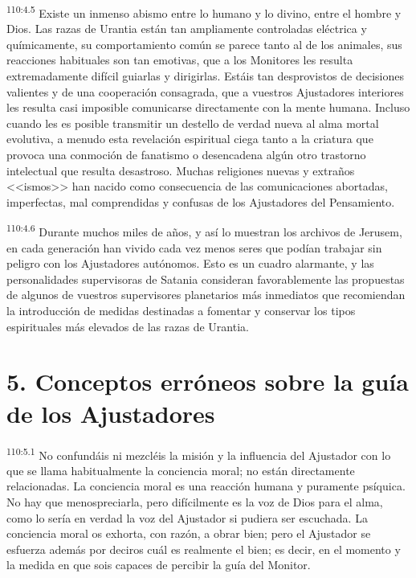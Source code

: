 \documentclass[twoside, 11pt]{book}
\begin{document}
\par
\textsuperscript{110:4.5} Existe un inmenso abismo entre lo humano y lo divino, entre el hombre y Dios. Las razas de Urantia están tan ampliamente controladas eléctrica y químicamente, su comportamiento común se parece tanto al de los animales, sus reacciones habituales son tan emotivas, que a los Monitores les resulta extremadamente difícil guiarlas y dirigirlas. Estáis tan desprovistos de decisiones valientes y de una cooperación consagrada, que a vuestros Ajustadores interiores les resulta casi imposible comunicarse directamente con la mente humana. Incluso cuando les es posible transmitir un destello de verdad nueva al alma mortal evolutiva, a menudo esta revelación espiritual ciega tanto a la criatura que provoca una conmoción de fanatismo o desencadena algún otro trastorno intelectual que resulta desastroso. Muchas religiones nuevas y extraños <<ismos>> han nacido como consecuencia de las comunicaciones abortadas, imperfectas, mal comprendidas y confusas de los Ajustadores del Pensamiento.

\par
\textsuperscript{110:4.6} Durante muchos miles de años, y así lo muestran los archivos de Jerusem, en cada generación han vivido cada vez menos seres que podían trabajar sin peligro con los Ajustadores autónomos. Esto es un cuadro alarmante, y las personalidades supervisoras de Satania consideran favorablemente las propuestas de algunos de vuestros supervisores planetarios más inmediatos que recomiendan la introducción de medidas destinadas a fomentar y conservar los tipos espirituales más elevados de las razas de Urantia.

\section*{5. Conceptos erróneos sobre la guía de los Ajustadores}
\par
\textsuperscript{110:5.1} No confundáis ni mezcléis la misión y la influencia del Ajustador con lo que se llama habitualmente la conciencia moral; no están directamente relacionadas. La conciencia moral es una reacción humana y puramente psíquica. No hay que menospreciarla, pero difícilmente es la voz de Dios para el alma, como lo sería en verdad la voz del Ajustador si pudiera ser escuchada. La conciencia moral os exhorta, con razón, a obrar bien; pero el Ajustador se esfuerza además por deciros cuál es realmente el bien; es decir, en el momento y la medida en que sois capaces de percibir la guía del Monitor.
\end{document}
